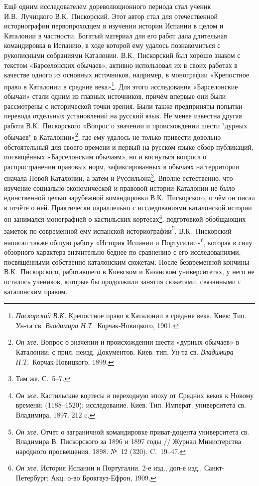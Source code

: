 Ещё одним исследователем дореволюционного периода стал ученик И.В.~Лучицкого В.К.~Пискорский. Этот автор стал для отечественной историографии первопроходцем в изучении истории Испании в целом и Каталонии в частности. Богатый материал для его работ дала длительная командировка в Испанию, в ходе которой ему удалось познакомиться с рукописными собраниями Каталонии. В.К.~Пискорский был хорошо знаком с текстом «Барселонских обычаев», активно использовал их в своих работах в качестве одного из основных источников, например, в монографии «Крепостное право в Каталонии в средние века»\footnote{\emph{Пискорский}\emph{ В.К.} Крепостное право в Каталонии в средние века. Киев: Тип. Ун-та св. \emph{Владимира Н.Т.}~Корчак-Новицкого, 1901.}. Для этого исследования «Барселонские обычаи» стали одним из главных источников, причём впервые они были рассмотрены с исторической точки зрения. Были также предприняты попытки перевода отдельных установлений на русский язык. Не менее известна другая работа В.К.~Пискорского «Вопрос о значении и происхождении шести "дурных обычаев" в Каталонии»\footnote{\emph{Он же.} Вопрос о значении и происхождении шести «дурных обычаев» в Каталонии: с прил. неизд. Документов. Киев: тип. Ун-та св. \emph{Владимира Н.Т.}~Корчак-Новицкого, 1899.}, где ему удалось не только привести довольно обстоятельный для своего времени и первый на русском языке обзор публикаций, посвящённых «Барселонским обычаям», но и коснуться вопроса о распространении правовых норм, зафиксированных в обычаях на территории сначала Новой Каталонии, а затем и Руссильона\footnote{Там же. С.~5--7.}. Вполне естественно, что изучение социально-экономической и правовой истории Каталонии не было единственной целью зарубежной командировки В.К.~Пискорского, о чём он писал в отчёте о ней. Практически параллельно с исследованиями каталонской истории он занимался монографией о кастильских кортесах\footnote{\emph{Он же.} Кастильские кортесы в переходную эпоху от Средних веков к Новому времени: (1188--1520): исследование. Киев: Тип. Императ. университета св. Владимира, 1897. 212 c.}, подготовкой обобщающих заметок по современной ему испанской историографии\footnote{\emph{Он же.} Отчет о заграничной командировке приват-доцента университета св. Владимира В. Пискорского за 1896 и 1897 годы // Журнал Министерства народного просвещения. 1898. №~12 (320). C.~19--47.}. В.К.~Пискорский написал также общую работу «История Испании и Португалии»\footnote{\emph{Он же.} История Испании и Португалии. 2-е изд., доп-е изд., Санкт-Петербург: Акц. о-во Брокгауз-Ефрон, 1909.}, которая в силу обзорного характера значительно беднее по сравнению с его исследованиями, посвящёнными собственно каталонским сюжетам. После безвременной кончины В.К.~Пискорского, работавшего в Киевском и Казанском университетах, у него не осталось учеников, которые бы продолжили занятия сюжетами, связанными с каталонским правом.

